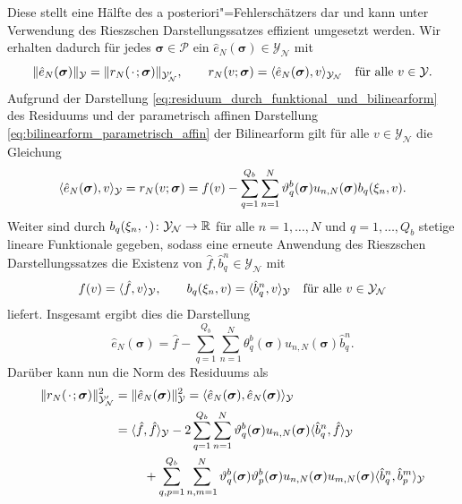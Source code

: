 \documentclass[../main.tex]{subfiles}
\begin{document}
Diese stellt eine Hälfte des a posteriori"=Fehlerschätzers dar und kann unter Verwendung des Rieszschen Darstellungssatzes effizient umgesetzt werden.
Wir erhalten dadurch für jedes $\bm \sigma \in \mathcal P$ ein $\hat{e}_{N}(\bm \sigma) \in \mathcal Y_{\mathcal N}$ mit
\begin{equation}
    \norm{\hat{e}_{N}(\bm \sigma)}_{\mathcal Y} = \norm{r_{N}(\blank; \bm \sigma)}_{\mathcal Y_{\mathcal N}'}, \qquad
    r_{N}(v; \bm \sigma) = \skp{\hat{e}_{N}(\bm \sigma)}{v}{\mathcal Y_{\mathcal N}} \quad \fa v \in \mathcal Y.
\end{equation}
Aufgrund der Darstellung \cref{eq:residuum_durch_funktional_und_bilinearform} des Residuums und der parametrisch affinen Darstellung \cref{eq:bilinearform_parametrisch_affin} der Bilinearform gilt für alle $v \in \mathcal Y_{\mathcal N}$ die Gleichung
\begin{equation}
    \skp{\hat{e}_{N}(\bm \sigma)}{v}{\mathcal Y}
    = r_{N}(v; \bm \sigma)
    = f(v) - \sum_{q = 1}^{Q_b} \sum_{n = 1}^{N} \theta_{q}^{b}(\bm \sigma) u_{n,N}(\bm \sigma) b_{q}(\xi_{n}, v).
\end{equation}
Weiter sind durch $b_{q}(\xi_{n}, \blank) \colon \mathcal Y_{\mathcal N} \to \mathbb{R}$ für alle $n = 1, \dots, N$ und $q = 1, \dots, Q_b$ stetige lineare Funktionale gegeben, sodass eine erneute Anwendung des Rieszschen Darstellungssatzes die Existenz von $\hat{f}, \hat{b}^{n}_{q} \in \mathcal Y_{\mathcal N}$ mit
\begin{equation}
    f(v) = \skp{\hat{f}}{v}{\mathcal Y},
    \qquad
    b_{q}(\xi_{n}, v) = \skp{\hat{b}^{n}_{q}}{v}{\mathcal Y}
    \quad \fa v \in \mathcal Y_{\mathcal N}
\end{equation}
liefert.
Insgesamt ergibt dies die Darstellung
\begin{equation}
    \hat{e}_{N}(\bm \sigma) = \hat{f} - \sum_{q = 1}^{Q_b} \sum_{n = 1}^{N} \theta_{q}^{b}(\bm \sigma) u_{n,N}(\bm \sigma) \hat{b}^{n}_{q}.
\end{equation}
Darüber kann nun die Norm des Residuums als
\begin{equation}
    \begin{aligned}
        \norm{r_{N}(\blank; \bm \sigma)}_{\mathcal Y_{\mathcal N}'}^{2}
        &= \norm{\hat{e}_{N}(\bm \sigma)}_{\mathcal Y}^{2}
        = \skp{\hat{e}_{N}(\bm \sigma)}{\hat{e}_{N}(\bm \sigma)}{\mathcal Y}
        \\&= \begin{multlined}[t]
            \skp{\hat{f}}{\hat{f}}{\mathcal Y}
                - 2 \sum_{q = 1}^{Q_b} \sum_{n = 1}^{N} \theta_{q}^{b}(\bm \sigma) u_{n,N}(\bm \sigma) \skp{\hat{b}^{n}_{q}}{\hat{f}}{\mathcal Y}
                \\+ \sum_{q, p = 1}^{Q_b} \sum_{n, m = 1}^{N} \theta_{q}^{b}(\bm \sigma) \theta_{p}^{b}(\bm \sigma) u_{n,N}(\bm \sigma) u_{m,N}(\bm \sigma) \skp{\hat{b}^{n}_{q}}{\hat{b}^{m}_{p}}{\mathcal Y}
        \end{multlined}
    \end{aligned}
\end{equation}
\end{document}
